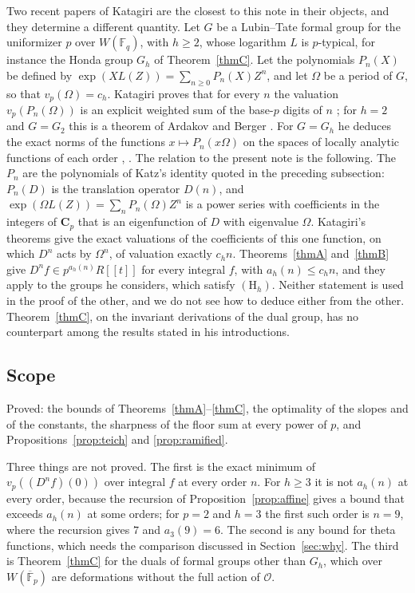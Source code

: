 \documentclass[11pt]{amsart}
\theoremstyle{definition}
\theoremstyle{remark}
\newcommand{\F}{\mathbb F}
\newcommand{\vp}{v_p}
\begin{document}
Two recent papers of Katagiri are the closest to this note in their objects, and they determine a different quantity. Let $G$ be a Lubin--Tate formal group for the uniformizer $p$ over $W(\F_q)$, with $h\ge2$, whose logarithm $L$ is $p$-typical, for instance the Honda group $G_h$ of Theorem~\ref{thmC}. Let the polynomials $P_n(X)$ be defined by $\exp(XL(Z))=\sum_{n\ge0}P_n(X)Z^n$, and let $\Omega$ be a period of $G$, so that $\vp(\Omega)=c_h$. Katagiri proves that for every $n$ the valuation $\vp(P_n(\Omega))$ is an explicit weighted sum of the base-$p$ digits of $n$ \cite[Theorem 1.2]{Katagiri26b}; for $h=2$ and $G=G_2$ this is a theorem of Ardakov and Berger \cite{AB26}. For $G=G_h$ he deduces the exact norms of the functions $x\mapsto P_n(x\Omega)$ on the spaces of locally analytic functions of each order \cite[Theorem 1.2]{Katagiri26a}, \cite[Theorem 1.3]{Katagiri26b}. The relation to the present note is the following. The $P_n$ are the polynomials of Katz's identity quoted in the preceding subsection: $P_n(D)$ is the translation operator $D(n)$, and $\exp(\Omega L(Z))=\sum_nP_n(\Omega)Z^n$ is a power series with coefficients in the integers of $\mathbf C_p$ that is an eigenfunction of $D$ with eigenvalue $\Omega$. Katagiri's theorems give the exact valuations of the coefficients of this one function, on which $D^n$ acts by $\Omega^n$, of valuation exactly $c_hn$. Theorems~\ref{thmA} and~\ref{thmB} give $D^nf\in p^{a_h(n)}R[[t]]$ for every integral $f$, with $a_h(n)\le c_hn$, and they apply to the groups he considers, which satisfy $(\mathrm H_h)$. Neither statement is used in the proof of the other, and we do not see how to deduce either from the other. Theorem~\ref{thmC}, on the invariant derivations of the dual group, has no counterpart among the results stated in his introductions.

\subsection{Scope}
Proved: the bounds of Theorems~\ref{thmA}--\ref{thmC}, the optimality of the slopes and of the constants, the sharpness of the floor sum at every power of $p$, and Propositions~\ref{prop:teich} and \ref{prop:ramified}.

Three things are not proved. The first is the exact minimum of $\vp((D^nf)(0))$ over integral $f$ at every order $n$. For $h\ge3$ it is not $a_h(n)$ at every order, because the recursion of Proposition~\ref{prop:affine} gives a bound that exceeds $a_h(n)$ at some orders; for $p=2$ and $h=3$ the first such order is $n=9$, where the recursion gives $7$ and $a_3(9)=6$. The second is any bound for theta functions, which needs the comparison discussed in Section~\ref{sec:why}. The third is Theorem~\ref{thmC} for the duals of formal groups other than $G_h$, which over $W(\overline{\F}_p)$ are deformations without the full action of $\mathcal O$.
\end{document}
